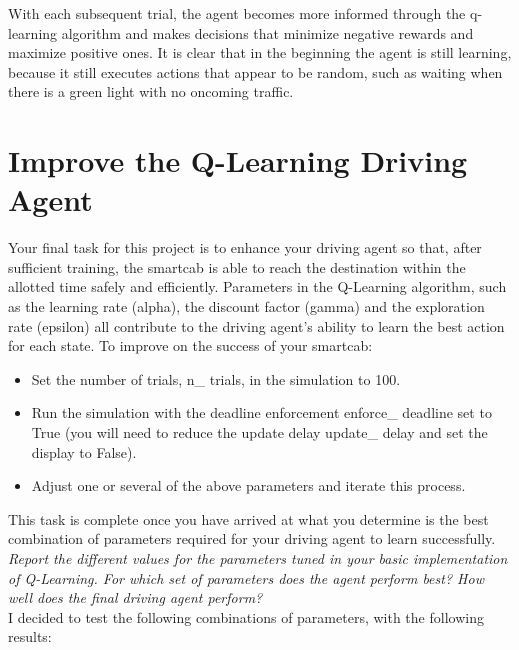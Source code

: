\documentclass[11pt]{article}
\begin{document}
With each subsequent trial, the agent becomes more informed through the q-learning algorithm and makes decisions that minimize negative rewards and maximize positive ones. It is clear that in the beginning the agent is still learning, because it still executes actions that appear to be random, such as waiting when there is a green light with no oncoming traffic.\\

\section{Improve the Q-Learning Driving Agent}

Your final task for this project is to enhance your driving agent so that, after sufficient training, the smartcab is able to reach the destination within the allotted time safely and efficiently. Parameters in the Q-Learning algorithm, such as the learning rate (alpha), the discount factor (gamma) and the exploration rate (epsilon) all contribute to the driving agent’s ability to learn the best action for each state. To improve on the success of your smartcab:\\

\begin{itemize}
  \item Set the number of trials, n\_ trials, in the simulation to 100.
  \item Run the simulation with the deadline enforcement enforce\_ deadline set to True (you will need to reduce the update delay update\_ delay and set the display to False).
  \item Adjust one or several of the above parameters and iterate this process.
\end{itemize}

This task is complete once you have arrived at what you determine is the best combination of parameters required for your driving agent to learn successfully.\\

\textit{Report the different values for the parameters tuned in your basic implementation of Q-Learning. For which set of parameters does the agent perform best? How well does the final driving agent perform?}\\

I decided to test the following combinations of parameters, with the following results:\\
\end{document}
